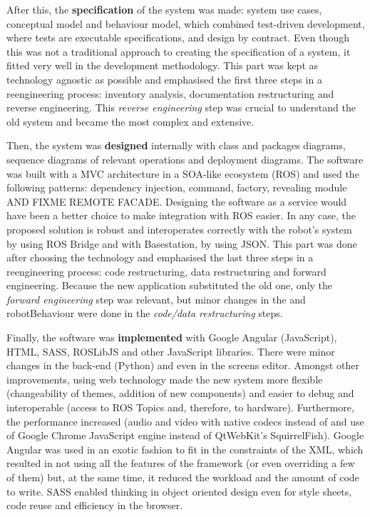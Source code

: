 After this, the \textbf{specification} of the system was made: system use cases, conceptual model and behaviour model, which combined test-driven development, where tests are executable specifications, and design by contract.
Even though this was not a traditional approach to creating the specification of a system, it fitted very well in the development methodology.
This part was kept as technology agnostic as possible and emphasised the first three steps in a reengineering process: inventory analysis, documentation restructuring and reverse engineering.
This \emph{reverse engineering} step was crucial to understand the old system and became the most complex and extensive.

Then, the system was \textbf{designed} internally with class and packages diagrams, sequence diagrams of relevant operations and deployment diagrams.
The software was built with a \ac{MVC} architecture in a \ac{SOA}-like ecosystem (\ac{ROS}) and used the following patterns: dependency injection, command, factory, revealing module AND FIXME REMOTE FACADE.
Designing the software as a service would have been a better choice to make integration with \ac{ROS} easier.
In any case, the proposed solution is robust and interoperates correctly with the robot's system by using ROS Bridge and with Basestation, by using JSON.
This part was done after choosing the technology and emphasised the last three steps in a reengineering process: code restructuring, data restructuring and forward engineering.
Because the new application substituted the old one, only the \emph{forward engineering} step was relevant, but minor changes in the \flangobe and robotBehaviour were done in the \emph{code/data restructuring} steps.

Finally, the software was \textbf{implemented} with Google Angular (JavaScript), \ac{HTML}, \ac{SASS}, ROSLibJS and other JavaScript libraries.
There were minor changes in the back-end (Python) and even in the screens editor.
Amongst other improvements, using web technology made the new system more flexible (changeability of themes, addition of new components) and easier to debug and interoperable (access to ROS Topics and, therefore, to hardware).
Furthermore, the performance increased (audio and video with native codecs instead of \flash and use of Google Chrome JavaScript engine instead of QtWebKit's SquirrelFish).
Google Angular was used in an exotic fashion to fit in the constraints of the \ac{XML}, which resulted in not using all the features of the framework (or even overriding a few of them) but, at the same time, it reduced the workload and the amount of code to write.
\ac{SASS} enabled thinking in object oriented design even for style sheets, code reuse and efficiency in the browser.


